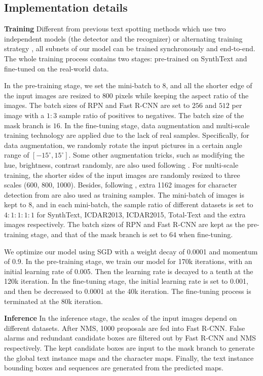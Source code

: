 \documentclass[runningheads]{llncs}
\begin{document}
\subsection{Implementation details}
\noindent\textbf{Training} Different from previous text spotting methods which use two independent models \cite{jaderberg2014deep,liao2017textboxes} (the detector and the recognizer) or alternating training strategy \cite{Li_2017_ICCV}, all subnets of our model can be trained synchronously and end-to-end. The whole training process contains two stages: pre-trained on SynthText and fine-tuned on the real-world data. 

In the pre-training stage, we set the mini-batch to $8$, and all the shorter edge of the input images are resized to $800$ pixels while keeping the aspect ratio of the images. The batch sizes of RPN and Fast R-CNN are set to $256$ and $512$ per image with a $1:3$ sample ratio of positives to negatives. The batch size of the mask branch is $16$. In the fine-tuning stage, data augmentation and multi-scale training technology are applied due to the lack of real samples. Specifically, for data augmentation, we randomly rotate the input pictures in a certain angle range of $[-15^\circ, 15^\circ]$. Some other augmentation tricks, such as modifying the hue, brightness, contrast randomly, are also used following \cite{liu2016ssd}. For multi-scale training, the shorter sides of the input images are randomly resized to three scales (600, 800, 1000). Besides, following \cite{Li_2017_ICCV}, extra 1162 images for character detection from \cite{zhong2016deeptext} are also used as training samples. The mini-batch of images is kept to 8, and in each mini-batch, the sample ratio of different datasets is set to $4:1:1:1:1$ for SynthText, ICDAR2013, ICDAR2015, Total-Text and the extra images respectively. The batch sizes of RPN and Fast R-CNN are kept as the pre-training stage, and that of the mask branch is set to $64$ when fine-tuning.

We optimize our model using SGD with a weight decay of 0.0001 and momentum of 0.9. In the pre-training stage, we train our model for 170k iterations, with an initial learning rate of 0.005. Then the learning rate is decayed to a tenth at the 120k iteration. In the fine-tuning stage, the initial learning rate is set to 0.001, and then be decreased to 0.0001 at the 40k iteration. The fine-tuning process is terminated at the 80k iteration.

\textbf{Inference} In the inference stage, the scales of the input images depend on different datasets. After NMS, 1000 proposals are fed into Fast R-CNN. False alarms and redundant candidate boxes are filtered out by Fast R-CNN and NMS respectively. The kept candidate boxes are input to the mask branch to generate the global text instance maps and the character maps. Finally, the text instance bounding boxes and sequences are generated from the predicted maps.
\end{document}
